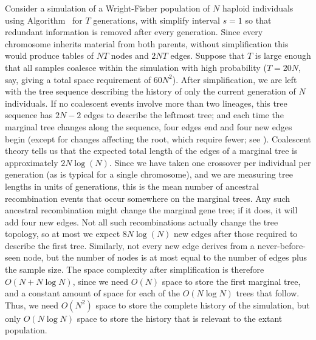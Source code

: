 \documentclass{article}
\begin{document}
Consider a simulation of a Wright-Fisher population of $N$ haploid individuals
using Algorithm~ for $T$ generations,
with simplify interval $s = 1$ so that redundant information is removed after every generation.
Since every chromosome inherits material from both parents,
without simplification this would produce tables of
$NT$ nodes and $2NT$ edges.
Suppose that $T$ is large enough that all samples coalesce within the simulation with high probability
($T = 20N$, say, giving a total space requirement of $60N^2$).
After simplification, we are left with the tree sequence describing the history
of only the current generation of $N$ individuals.
If no coalescent events involve more than two lineages, this tree sequence has $2N-2$ edges to describe the leftmost tree;
and each time the marginal tree changes along the sequence,
four edges end and four new edges begin
(except for changes affecting the root, which require fewer; see \citet{kelleher2016efficient}).
Coalescent theory tells us that
the expected total length of the edges of a marginal tree is approximately $2N\log(N)$.
Since we have taken one crossover per individual per generation (as is typical for a single chromosome),
and we are measuring tree lengths in units of generations,
this is the mean number of ancestral recombination events that occur somewhere on the marginal trees.
Any such ancestral recombination might change the marginal gene tree;
if it does, it will add four new edges.
Not all such recombinations actually change the tree topology,
so at most we expect $8N\log(N)$ new edges after those required to describe the first tree.
Similarly, not every new edge derives from a never-before-seen node,
but the number of nodes is at most equal to the number of edges plus the sample size.
The space complexity after simplification is therefore $O(N + N\log N)$, since
we need $O(N)$ space to store the first marginal tree, and a constant amount of space
for each of the $O(N \log N)$ trees that follow. Thus, we need $O(N^2)$ space
to store the complete history of the simulation, but only $O(N \log N)$ %
space to store the history that is relevant to the extant population.
\end{document}
